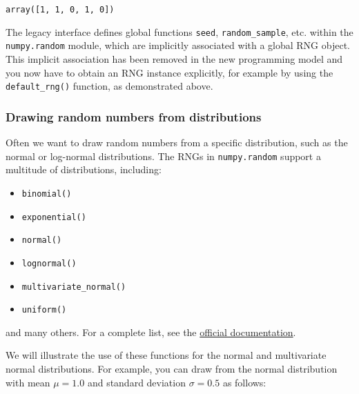 \documentclass[10pt]{scrartcl}
\makeatletter
\providecommand{\tightlist}{%
      \setlength{\itemsep}{0pt}\setlength{\parskip}{0pt}}
\newcommand{\boxspacing}{\kern\kvtcb@left@rule\kern\kvtcb@boxsep}
\newcommand{\prompt}[4]{
        {\ttfamily\llap{{\color{#2}[#3]:\hspace{3pt}#4}}\vspace{-\baselineskip}}
    }
\makeatother
\begin{document}
            \begin{tcolorbox}[breakable, size=fbox, boxrule=.5pt, pad at break*=1mm, opacityfill=0]
\prompt{Out}{outcolor}{11}{\boxspacing}
\begin{Verbatim}[commandchars=\\\{\}]
array([1, 1, 0, 1, 0])
\end{Verbatim}
\end{tcolorbox}
        
    The legacy interface defines global functions \texttt{seed},
\texttt{random\_sample}, etc. within the \texttt{numpy.random} module,
which are implicitly associated with a global RNG object. This implicit
association has been removed in the new programming model and you now
have to obtain an RNG instance explicitly, for example by using the
\texttt{default\_rng()} function, as demonstrated above.

    \hypertarget{drawing-random-numbers-from-distributions}{%
\subsubsection{Drawing random numbers from
distributions}\label{drawing-random-numbers-from-distributions}}

Often we want to draw random numbers from a specific distribution, such
as the normal or log-normal distributions. The RNGs in
\texttt{numpy.random} support a multitude of distributions, including:

\begin{itemize}
\tightlist
\item
  \texttt{binomial()}
\item
  \texttt{exponential()}
\item
  \texttt{normal()}
\item
  \texttt{lognormal()}
\item
  \texttt{multivariate\_normal()}
\item
  \texttt{uniform()}
\end{itemize}

and many others. For a complete list, see the
\href{https://numpy.org/doc/stable/reference/random/generator.html\#distributions}{official
documentation}.

We will illustrate the use of these functions for the normal and
multivariate normal distributions. For example, you can draw from the
normal distribution with mean \(\mu=1.0\) and standard deviation
\(\sigma=0.5\) as follows:
\end{document}

